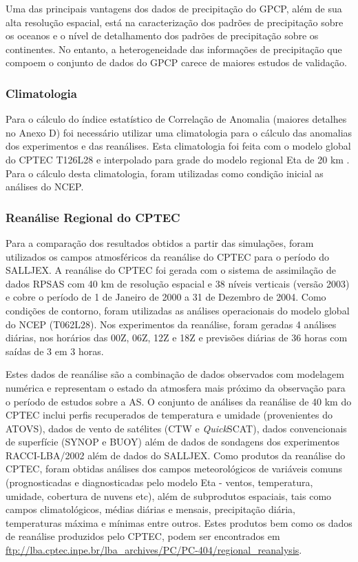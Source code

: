 Uma das principais vantagens dos dados de precipitação do GPCP, além de sua alta resolução espacial, está na caracterização dos padrões de precipitação sobre os oceanos e o nível de detalhamento dos padrões de precipitação sobre os continentes. No entanto, a heterogeneidade das informações de precipitação que compoem o conjunto de dados do GPCP carece de maiores estudos de validação.

\subsubsection{Climatologia}

Para o cálculo do índice estatístico de Correlação de Anomalia (maiores detalhes no Anexo D) foi necessário utilizar uma climatologia para o cálculo das anomalias dos experimentos e das reanálises. Esta climatologia foi feita com o modelo global do CPTEC T126L28 e interpolado para grade do modelo regional Eta de 20 km \cite{sapucci09}. Para o cálculo desta climatologia, foram utilizadas como condição inicial as análises do NCEP.

\subsubsection{Reanálise Regional do CPTEC}
    
Para a comparação dos resultados obtidos a partir das simulações, foram utilizados os campos atmosféricos da reanálise do CPTEC \cite{aravequiaetal07} para o período do SALLJEX. A reanálise do CPTEC foi gerada com o sistema de assimilação de dados RPSAS com 40 km de resolução espacial e 38 níveis verticais (versão 2003) e cobre o período de 1 de Janeiro de 2000 a 31 de Dezembro de 2004. Como condições de contorno, foram utilizadas as análises operacionais do modelo global do NCEP (T062L28). Nos experimentos da reanálise, foram geradas 4 análises diárias, nos horários das 00Z, 06Z, 12Z e 18Z e previsões diárias de 36 horas com saídas de 3 em 3 horas. 

Estes dados de reanálise são a combinação de dados observados com modelagem numérica e representam o estado da atmosfera mais próximo da observação para o período de estudos sobre a AS. O conjunto de análises da reanálise de 40 km do CPTEC inclui perfis recuperados de temperatura e umidade (provenientes do ATOVS), dados de vento de satélites (CTW e \textit{Quick}SCAT), dados convencionais de superfície (SYNOP e BUOY) além de dados de sondagens dos experimentos RACCI-LBA/2002 \cite{silvadiasetal03} além de dados do SALLJEX. Como produtos da reanálise do CPTEC, foram obtidas análises dos campos meteorológicos de variáveis comuns (prognosticadas e diagnosticadas pelo modelo Eta - ventos, temperatura, umidade, cobertura de nuvens etc), além de subprodutos espaciais, tais como campos climatológicos, médias diárias e mensais, precipitação diária, temperaturas máxima e mínimas entre outros. Estes produtos bem como os dados de reanálise produzidos pelo CPTEC, podem ser encontrados em \url{ftp://lba.cptec.inpe.br/lba_archives/PC/PC-404/regional_reanalysis}.

